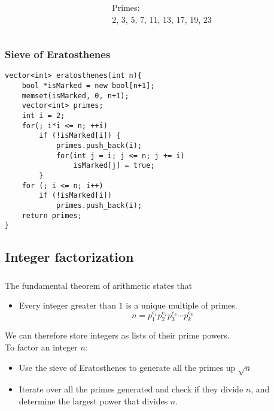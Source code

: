 \documentclass[10pt]{beamer}
\newcommand{\bi}{\begin{itemize}}
\newcommand{\ei}{\end{itemize}}
\begin{document}
\begin{frame}[fragile]
\begin{columns}[T]
\begin{column}{.7\textwidth}
    \end{column}
    \begin{column}{.5\textwidth}
      Primes: \\
      \color{title}
       $2$,
       $3$,
       $5$,
       $7$,
       $11$,
       $13$,
       $17$,
       $19$,
       $23$
    \end{column}
  \end{columns}
\end{frame}

\begin{frame}[fragile]
  \frametitle{Sieve of Eratosthenes}
      \begin{verbatim}
vector<int> eratosthenes(int n){
    bool *isMarked = new bool[n+1];
    memset(isMarked, 0, n+1);
    vector<int> primes;
    int i = 2;
    for(; i*i <= n; ++i)
        if (!isMarked[i]) {
            primes.push_back(i);
            for(int j = i; j <= n; j += i)
                isMarked[j] = true;
        }
    for (; i <= n; i++)
        if (!isMarked[i])
            primes.push_back(i);
    return primes;
}
    \end{verbatim}
\end{frame}

\subsection{Integer factorization}

\begin{frame}
  \frametitle{\insertsubsection}
  \vspace{10pt}
  The fundamental theorem of arithmetic states that
  \bi
    \item Every integer greater than $1$ is a unique multiple of primes.
    \[
      n = p_1^{e_1}p_2^{e_2}p_3^{e_3}\cdots p_k^{e_k}
    \]
  \ei
  We can therefore store integers as lists of their prime powers. \\
  \vspace{10pt}
  To factor an integer $n$:
  \bi
    \item Use the sieve of Eratosthenes to generate all the primes up
      $\sqrt{n}$
    \item Iterate over all the primes generated and check if they divide $n$,
      and determine the largest power that divides $n$.
  \ei
\end{frame}
\end{document}
